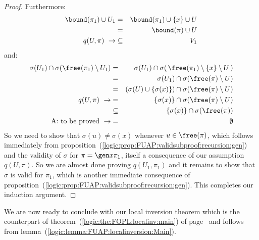 \begin{proof}
Furthermore:
    \begin{eqnarray*}
    \bound(\pi_{1})\cup U_{1}&=&\bound(\pi_{1})\cup\{x\}\cup U\\
    &=&\bound(\pi)\cup U\\
    q(U,\pi)\ \rightarrow&\subseteq& V_{1}
    \end{eqnarray*}
and:
    \begin{eqnarray*}
    \sigma(U_{1})\cap\sigma(\free(\pi_{1})\setminus U_{1})
    &=&\sigma(U_{1})\cap\sigma(\,\free(\pi_{1})\setminus\{x\}\setminus
    U\,)\\
    &=&\sigma(U_{1})\cap\sigma(\free(\pi)\setminus U)\\
    &=&(\sigma(U)\cup\{\sigma(x)\})\cap\sigma(\free(\pi)\setminus
    U)\\
    q(U,\pi)\ \rightarrow&=&\{\sigma(x)\}\cap\sigma(\free(\pi)\setminus
    U)\\
    &\subseteq&\{\sigma(x)\}\cap\sigma(\free(\pi))\\
    \mbox{A: to be proved}\ \rightarrow&=&\emptyset
    \end{eqnarray*}
So we need to show that $\sigma(u)\neq\sigma(x)$ whenever
$u\in\free(\pi)$, which follows immediately from
proposition~(\ref{logic:prop:FUAP:validsubproof:recursion:gen}) and
the validity of $\sigma$ for $\pi=\gen x\pi_{1}$, itself a
consequence of our assumption $q(U,\pi)$. So we are almost done
proving $q(U_{1},\pi_{1})$ and it remains to show that $\sigma$ is
valid for $\pi_{1}$, which is another immediate consequence of
proposition~(\ref{logic:prop:FUAP:validsubproof:recursion:gen}).
This completes our induction argument.
\end{proof}

We are now ready to conclude with our local inversion theorem which
is the counterpart of theorem~(\ref{logic:the:FOPL:localinv:main})
of page~\pageref{logic:the:FOPL:localinv:main} and follows from
lemma~(\ref{logic:lemma:FUAP:localinversion:Main}).

